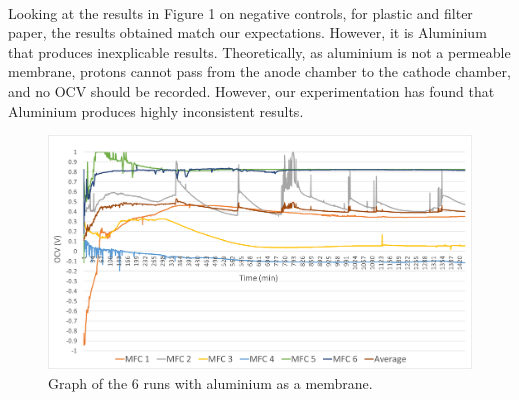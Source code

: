 \documentclass[12pt, twocolumn, a4paper]{article}
\begin{document}
    \paragraph{}Looking at the results in Figure 1 on negative controls, for plastic and filter paper, the results obtained match our expectations. However, it is Aluminium that produces inexplicable results. Theoretically, as aluminium is not a permeable membrane, protons cannot pass from the anode chamber to the cathode chamber, and no OCV should be recorded. However, our experimentation has found that Aluminium produces highly inconsistent results.
    \begin{figure}
        \centering
        \includegraphics[scale = 0.25]{aluminium.png}
        \caption{Graph of the 6 runs with aluminium as a membrane.}
        \label{fig:my_label}
    \end{figure}
\end{document}
